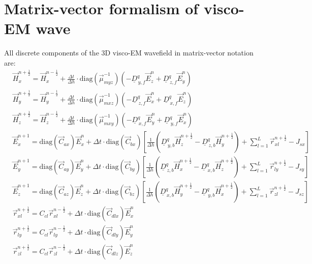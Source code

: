 \documentclass[pdftex,a4paper,parskip,listof=totoc,bibliography=totoc,onehalfspacing,12pt]{scrreprt}
\begin{document}
\section{Matrix-vector formalism of visco-EM wave}
All discrete components of the 3D visco-EM wavefield in matrix-vector notation are: 
\begin{equation}	
\begin{align*}
  &\vec{H}_{x}^{n+\frac{1}{2}} = \vec{H}_{x}^{n-\frac{1}{2}} + \frac{\Delta t}{\Delta h} \cdot  \mathrm{diag} \left(\vec{\mu}_{myz}^{-1}\right)  \left(- \underline{D}_{\,y,f}^q \vec{E}_{z}^{n} + \underline{D}_{\,z,f}^q \vec{E}_{y}^{n} \right)\\
  &\vec{H}_{y}^{n+\frac{1}{2}} = \vec{H}_{y}^{n-\frac{1}{2}} + \frac{\Delta t}{\Delta h} \cdot  \mathrm{diag} \left(\vec{\mu}_{mxz}^{-1}\right)  \left(- \underline{D}_{\,z,f}^q \vec{E}_{x}^{n} + \underline{D}_{\,x,f}^q \vec{E}_z^{n} \right)\\
  &\vec{H}_{z}^{n+\frac{1}{2}} = \vec{H}_{z}^{n-\frac{1}{2}} + \frac{\Delta t}{\Delta h} \cdot  \mathrm{diag} \left(\vec{\mu}_{mxy}^{-1}\right)  \left(- \underline{D}_{\,x,f}^q \vec{E}_y^{n} + \underline{D}_{\,y,f}^q \vec{E}_x^{n} \right)\\  
  &\vec{E}_{x}^{n+1} =  \mathrm{diag} \left(\vec{C}_{ax}\right) \vec{E}_{x}^{n} + \Delta t \cdot \mathrm{diag} \left(\vec{C}_{bx}\right) \left[ \frac{1}{\Delta h} \left( \underline{D}_{\,y,b}^q \vec{H}_z^{n+\frac{1}{2}} - \underline{D}_{\,z,b}^q \vec{H}_y^{n+\frac{1}{2}} \right) + \sum_{l=1}^L \vec{r}_{xl}^{n+\frac{1}{2}} - J_{sx} \right]\\ 
  &\vec{E}_{y}^{n+1} =  \mathrm{diag} \left(\vec{C}_{ay}\right) \vec{E}_{y}^{n} + \Delta t \cdot \mathrm{diag} \left(\vec{C}_{by}\right) \left[ \frac{1}{\Delta h} \left( \underline{D}_{\,z,b}^q  \vec{H}_x^{n+\frac{1}{2}} - \underline{D}_{\,x,b}^q \vec{H}_z^{n+\frac{1}{2}} \right) + \sum_{l=1}^L \vec{r}_{ly}^{n+\frac{1}{2}} - J_{sy} \right]\\ 
  &\vec{E}_{z}^{n+1} =  \mathrm{diag} \left(\vec{C}_{az}\right) \vec{E}_{z}^{n} + \Delta t \cdot \mathrm{diag} \left(\vec{C}_{bz}\right) \left[ \frac{1}{\Delta h} \left(\underline{D}_{\,x,b}^q \vec{H}_y^{n+\frac{1}{2}} - \underline{D}_{\,y,b}^q \vec{H}_x^{n+\frac{1}{2}} \right) + \sum_{l=1}^L \vec{r}_{zl}^{n+\frac{1}{2}} - J_{sz} \right]\\ 
  &\vec{r}_{xl}^{n+\frac{1}{2}} =  C_{c l} \vec{r}_{xl}^{n-\frac{1}{2}} + \Delta t \cdot \mathrm{diag} \left(\vec{C}_{d l x}\right) \vec{E}_{x}^{n} \\
  &\vec{r}_{ly}^{n+\frac{1}{2}} =  C_{c l} \vec{r}_{ly}^{n-\frac{1}{2}} + \Delta t \cdot \mathrm{diag} \left(\vec{C}_{d l y}\right) \vec{E}_{y}^{n}\\
  &\vec{r}_{zl}^{n+\frac{1}{2}} =  C_{c l} \vec{r}_{zl}^{n-\frac{1}{2}} + \Delta t \cdot \mathrm{diag} \left(\vec{C}_{d l z}\right) \vec{E}_{z}^{n}
\end{align*}
\end{equation}
\end{document}
